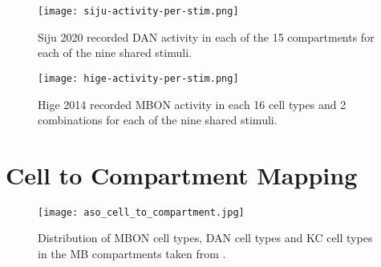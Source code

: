 \documentclass[11pt, A4]{article}
\begin{document}
\begin{figure}[H]
	\centering
	\texttt{[image: siju-activity-per-stim.png]}
	\caption{Siju 2020 recorded DAN activity in each of the 15 compartments for each of the nine shared stimuli.}
	\label{fig:siju-activity-per-stim}
\end{figure}

\begin{figure}[H]
	\centering
	\texttt{[image: hige-activity-per-stim.png]}
	\caption{Hige 2014 recorded MBON activity in each 16 cell types and 2 combinations for each of the nine shared stimuli.}
	\label{fig:hige-activity-per-stim}
\end{figure}

\newpage

\section{Cell to Compartment Mapping}

\begin{figure}[H]
	\centering
	\texttt{[image: aso\_cell\_to\_compartment.jpg]}
	\caption{Distribution of MBON cell types, DAN cell types and KC cell types in the MB compartments taken from \cite{aso2014neuronal}.}
	\label{fig:mbons_per_lobe}
\end{figure}








\end{document}

